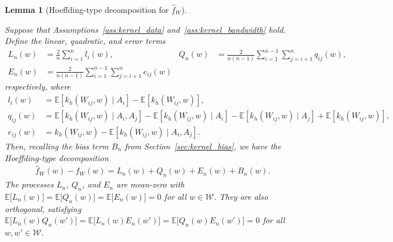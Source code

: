 \documentclass[11pt,lof]{puthesis}
\newcommand{\E}{\ensuremath{\mathbb{E}}}
\newcommand{\cW}{\ensuremath{\mathcal{W}}}
\theoremstyle{break}
\newtheorem{lemma}{Lemma}[section]
\theoremstyle{proof}
\begin{document}
\begin{lemma}[Hoeffding-type decomposition for $\hat f_W$]
  \label{lem:kernel_hoeffding}

  Suppose that Assumptions~\ref{ass:kernel_data} and~\ref{ass:kernel_bandwidth}
  hold. Define the linear, quadratic, and error terms
  \begin{align*}
    L_n(w)
    &=
    \frac{2}{n} \sum_{i=1}^n l_i(w),
    &Q_n(w) &= \frac{2}{n(n-1)} \sum_{i=1}^{n-1} \sum_{j=i+1}^{n} q_{i j}(w), \\
    E_n(w) &= \frac{2}{n(n-1)} \sum_{i=1}^{n-1} \sum_{j=i+1}^{n} e_{i j}(w)
  \end{align*}
  respectively, where
  \begin{align*}
    l_i(w)
    &=
    \E\left[k_h(W_{i j},w) \mid A_i\right] - \E\left[k_h(W_{i j},w)\right], \\
    q_{i j}(w)
    &=
    \E\left[k_h(W_{i j},w) \mid A_i, A_j\right]
    - \E\left[k_h(W_{i j},w) \mid A_i\right]
    - \E\left[k_h(W_{i j},w) \mid A_j\right]
    + \E\left[k_h(W_{i j},w)\right], \\
    e_{i j}(w)
    &=
    k_h(W_{i j},w) - \E\left[k_h(W_{i j},w) \mid A_i, A_j\right].
  \end{align*}
  Then, recalling the bias term $B_n$ from Section~\ref{sec:kernel_bias},
  we have the Hoeffding-type decomposition
  \begin{align}
    \label{eq:kernel_hoeffding}
    \hat f_W(w) - f_W(w) = L_n(w) + Q_n(w) + E_n(w) + B_n(w).
  \end{align}
  The processes $L_n$, $Q_n$, and $E_n$ are mean-zero
  with $\E\big[L_n(w)\big] = \E\big[Q_n(w)\big] = \E\big[E_n(w)\big] = 0$
  for all $w \in \cW$. They are also orthogonal,
  satisfying $\E\big[ L_n(w) Q_n(w') \big] = \E\big[ L_n(w) E_n(w') \big]
  = \E\big[ Q_n(w) E_n(w') \big] = 0$ for all $w, w' \in \cW$.
\end{lemma}
\end{document}
